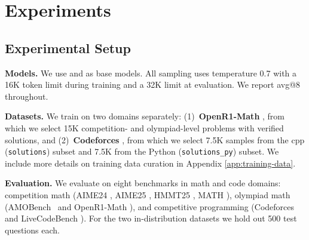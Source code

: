 \section{Experiments}
\label{sec:experiments}




\subsection{Experimental Setup}
\label{sec:setup}

\textbf{Models.} We use \qwen{} \citep{yang2025qwen3technicalreport} and \olmo{} \citep{olmo2025olmo3} as base models. All sampling uses temperature 0.7 with a 16K token limit during training and a 32K limit at evaluation. We report avg@8 throughout.

\textbf{Datasets.} We train on two domains separately: (1)~\textbf{OpenR1-Math} \citep{openr1}, from which we select 15K competition- and olympiad-level problems with verified solutions, and (2)~\textbf{Codeforces} \citep{penedo2025codeforces}, from which we select 7.5K samples from the cpp (\texttt{solutions}) subset and 7.5K from the Python (\texttt{solutions\_py}) subset. We include more details on training data curation in Appendix \ref{app:training-data}.


\textbf{Evaluation. } We evaluate on eight benchmarks in math and code domains: competition math (AIME24 \citep{aime24}, AIME25 \citep{aime25}, HMMT25 \citep{hmmt_2025}, MATH \citep{hendrycks2021measuringmathematicalproblemsolving}), olympiad math (AMOBench~\citep{an2025amobenchlargelanguagemodels} and OpenR1-Math \citep{openr1}), and competitive programming (Codeforces \citep{penedo2025codeforces} and LiveCodeBench \citep{jain2024livecodebenchholisticcontaminationfree}). For the two in-distribution datasets we hold out 500 test questions each.


